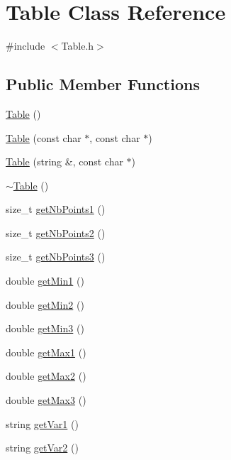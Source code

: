 \hypertarget{classTable}{
\section{Table Class Reference}
\label{de/d4a/classTable}
}


{\ttfamily \#include $<$Table.h$>$}

\subsection*{Public Member Functions}
\begin{DoxyCompactItemize}
\item 
\hyperlink{classTable_a2a7f82c625b00a53f710b2ed305248d2}{Table} ()
\item 
\hyperlink{classTable_aa2284410cc84fce3608734f7d629cace}{Table} (const char $\ast$, const char $\ast$)
\item 
\hyperlink{classTable_a1740f4f7bc301e03985e67ff91eea876}{Table} (string \&, const char $\ast$)
\item 
\hyperlink{classTable_aebcdd0ef66a6805bd3929ff71851f7e9}{$\sim$Table} ()
\item 
size\_\-t \hyperlink{classTable_ab6912afe8c88aeae10523e8c9deb0594}{getNbPoints1} ()
\item 
size\_\-t \hyperlink{classTable_a16769f00f5e81e8a383be2c7e5a97d4e}{getNbPoints2} ()
\item 
size\_\-t \hyperlink{classTable_adb2f7cf35fc99e71631c0e4b62fac41d}{getNbPoints3} ()
\item 
double \hyperlink{classTable_a1f336d2c09062ed1db58616b57b58560}{getMin1} ()
\item 
double \hyperlink{classTable_acf8ec98440797f11525eb4df33bdcf0a}{getMin2} ()
\item 
double \hyperlink{classTable_a4c3e0e13eee8343019d04c7c43cc5b77}{getMin3} ()
\item 
double \hyperlink{classTable_a53705cccc6b9b687995a0d3eb3c2ce9a}{getMax1} ()
\item 
double \hyperlink{classTable_ac58da5aef38fbba92abd84c680a89277}{getMax2} ()
\item 
double \hyperlink{classTable_a441284a40c09c0d6dec0087b4ccf5331}{getMax3} ()
\item 
string \hyperlink{classTable_a2866ab214cb3b74d5c7febe45b1a17c2}{getVar1} ()
\item 
string \hyperlink{classTable_aed0085e8e89d1adc1d4113e730be5db2}{getVar2} ()
\item 

\end{DoxyCompactItemize}
